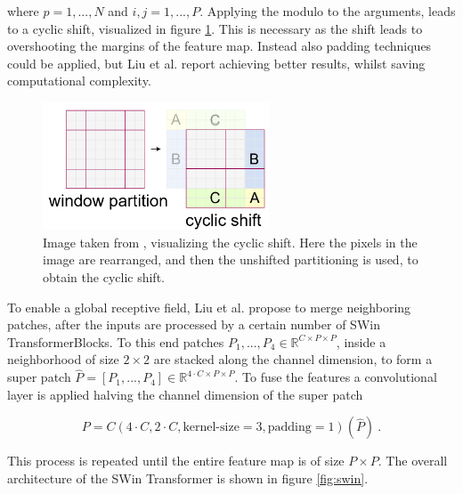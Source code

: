 where $p = 1, ..., N$ and $i, j = 1, ..., P$. 
Applying the modulo to the arguments, leads to a cyclic shift, visualized in figure \ref{fig:cyclic_shift}.
This is necessary as the shift leads to overshooting the margins of the feature map.
Instead also padding techniques could be applied,
but Liu et al. \cite{liuSwinTransformerHierarchical2021} report achieving better results, 
whilst saving computational complexity.

\begin{figure}[h!]
    \begin{center}
        \includegraphics[width=0.6\textwidth]{models/preliminaries/imgs/cyclic-shift.png}
    \end{center}
    \caption{Image taken from \cite{liuSwinTransformerHierarchical2021}, visualizing the cyclic shift.
        Here the pixels in the image are rearranged, and then the unshifted partitioning is used, to obtain the cyclic shift.}
    \label{fig:cyclic_shift}
\end{figure}

To enable a global receptive field, 
Liu et al. \cite{liuSwinTransformerHierarchical2021} propose to merge neighboring patches, 
after the inputs are processed by a certain number of SWin TransformerBlocks.
To this end patches $P_1, ..., P_4 \in \mathbb R^{C \times P \times P}$,
inside a neighborhood of size $2 \times 2$ are stacked along the channel dimension,
to form a super patch $\hat{P} = [P_1, ..., P_4] \in \mathbb R^{4 \cdot C \times P \times P}$.
To fuse the features a convolutional layer is applied halving the channel dimension of the super patch

    \begin{equation*}
        P = C(4 \cdot C, 2 \cdot C, \text{kernel-size}=3, \text{padding}=1)(\hat{P}) ~.
    \end{equation*}

This process is repeated until the entire feature map is of size $P \times P$.
The overall architecture of the SWin Transformer is shown in figure \ref{fig:swin}.

